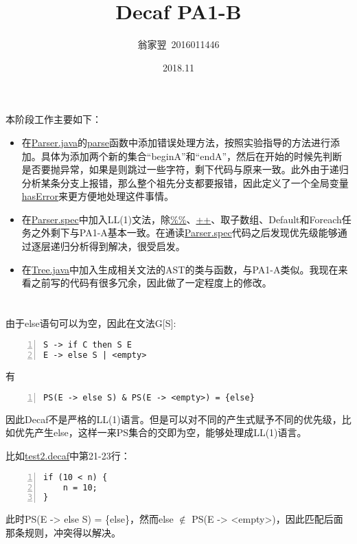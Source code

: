 \documentclass[a4paper]{article}
\title{\bf Decaf PA1-B}
\date{2018.11}
\author{翁家翌~2016011446}
\begin{document}
\kaishu
\ttfamily
\maketitle
\section{}
本阶段工作主要如下：
\begin{itemize}
	\item 在\uline{Parser.java}的\uline{parse}函数中添加错误处理方法，按照实验指导的方法进行添加。具体为添加两个新的集合“beginA”和“endA”，然后在开始的时候先判断是否要抛异常，如果是则跳过一些字符，剩下代码与原来一致。此外由于递归分析某条分支上报错，那么整个祖先分支都要报错，因此定义了一个全局变量\uline{hasError}来更方便地处理这件事情。
	\item 在\uline{Parser.spec}中加入LL(1)文法，除\uline{\%\%}、\uline{++}、取子数组、Default和Foreach任务之外剩下与PA1-A基本一致。在通读\uline{Parser.spec}代码之后发现优先级能够通过逐层递归分析得到解决，很受启发。
	\item 在\uline{Tree.java}中加入生成相关文法的AST的类与函数，与PA1-A类似。我现在来看之前写的代码有很多冗余，因此做了一定程度上的修改。
\end{itemize}
\section{}
由于else语句可以为空，因此在文法G[S]:
\begin{lstlisting}[basicstyle=\ttfamily\small, numbers=left, frame=shadowbox, rulesepcolor=\color{red!20!green!20!blue!20},extendedchars=true,breaklines=true]
S -> if C then S E
E -> else S | <empty>
\end{lstlisting}
有
\begin{lstlisting}[basicstyle=\ttfamily\small, numbers=left, frame=shadowbox, rulesepcolor=\color{red!20!green!20!blue!20},extendedchars=true,breaklines=true]
PS(E -> else S) & PS(E -> <empty>) = {else}
\end{lstlisting}
因此Decaf不是严格的LL(1)语言。但是可以对不同的产生式赋予不同的优先级，比如优先产生else，这样一来PS集合的交即为空，能够处理成LL(1)语言。

比如\uline{test2.decaf}中第21-23行：
\begin{lstlisting}[basicstyle=\ttfamily\small, numbers=left, frame=shadowbox, rulesepcolor=\color{red!20!green!20!blue!20},extendedchars=true,breaklines=true]
if (10 < n) {
    n = 10;
}
\end{lstlisting}
此时{PS(E -> else S) = \{else\}}，然而{else $\not\in$ PS(E -> <empty>)}，因此匹配后面那条规则，冲突得以解决。
\end{document}

